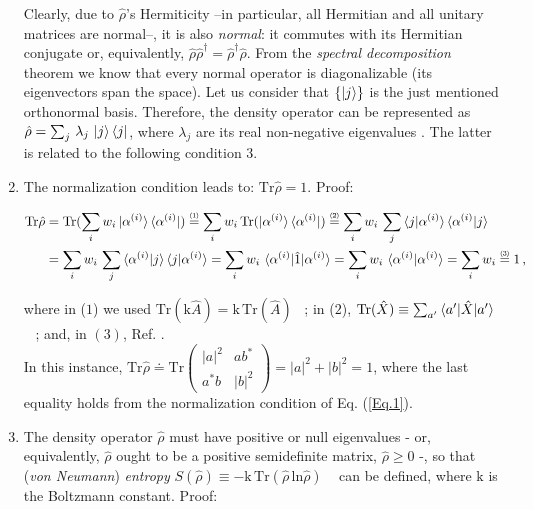 \documentclass[11pt]{article}
\numberwithin{equation}{section} %
\numberwithin{figure}{section} %
\newcommand\numeq[1] %
  {\stackrel{\scriptscriptstyle(\mkern-1.5mu#1\mkern-1.5mu)}{=}}
\begin{document}
\begin{appendices}
\begin{enumerate}
Clearly, due to $\hat{\rho}$'s Hermiticity --in particular, all Hermitian and all unitary matrices are normal--, it is also \emph{normal}: it commutes with its Hermitian conjugate or, equivalently, $\hat{\rho}\hat{\rho}^\dagger=\hat{\rho}^\dagger\hat{\rho}$. From the \emph{spectral decomposition} theorem \cite[p.~72, Theo.~2.1]{Nielsen} we know that every normal operator is diagonalizable (its eigenvectors span the space). Let us consider that $\{\ket{j}\}$ is the just mentioned orthonormal basis. Therefore, the density operator can be represented as $\hat{\rho}=\sum_j\,\lambda_j\,\ket{j}\bra{j}$, where $\lambda_j$ are its real non-negative eigenvalues \cite[p.~101, Eq.~(2.157)]{Nielsen}. The latter is related to the following condition 3.

\item The normalization condition leads to: $\textrm{Tr}\hat{\rho}=1$. Proof: 

\begin{equation} \label{trace_normalization}
\begin{split}
\textrm{Tr}\hat{\rho}
&=\textrm{Tr}(\sum_iw_i\ket{\alpha^{(i)}}\bra{\alpha^{(i)}})\numeq{1}\sum_iw_i\,\textrm{Tr}(\ket{\alpha^{(i)}}\bra{\alpha^{(i)}})\numeq{2}\sum_iw_i\,\sum_j\braket{j|\alpha^{(i)}}\braket{\alpha^{(i)}|j}\\
&=\sum_iw_i\,\sum_j\braket{\alpha^{(i)}|j}\braket{j|\alpha^{(i)}}=\sum_iw_i\,\braket{\alpha^{(i)}|\hat{1}|\alpha^{(i)}}=\sum_iw_i\,\braket{\alpha^{(i)}|\alpha^{(i)}}=\sum_iw_i\numeq{3}1\,\textrm{,}
\end{split}
\end{equation}

where in ($1$) we used $\textrm{Tr}(\textrm{k}\hat{A})=\textrm{k}\,\textrm{Tr}(\hat{A})$ $\,\,\,$; in ($2$), $\textrm{Tr}(\hat{X})\equiv\sum_{a^\prime}\braket{a^\prime|\hat{X}|a^\prime}$ $\,\,\,$  \cite[p.~37, Eq.~(1.5.14)]{Sakurai}; and, in $(3)$, Ref. \cite[p.~108, Eq.~(3.4.5)]{Sakurai}.\\

In this instance,  $\textrm{Tr}\hat{\rho}\doteq \textrm{Tr}\begin{pmatrix} |a|^2&ab^* \\ a^*b&|b|^2 \end{pmatrix}=|a|^2+|b|^2=1$, where the last equality holds from the normalization condition of Eq. (\ref{Eq.1}).
\item The density operator $\hat{\rho}$ must have positive or null eigenvalues - or, equivalently, $\hat{\rho}$ ought to be a positive semidefinite matrix, $\hat{\rho}\geq 0$ -, so that (\emph{von Neumann}) \emph{entropy} $S(\hat{\rho})\equiv-\textrm{k}\,\textrm{Tr}(\hat{\rho}\,\textrm{ln}\hat{\rho})$ $\,\,\,$  \cite[p.~187, Eq.~(3.4.35-36) \& (3.4.41)]{Sakurai} can be defined, where $\textrm{k}$ is the Boltzmann constant. Proof:\\


\end{enumerate}
\end{appendices}
\end{document}
